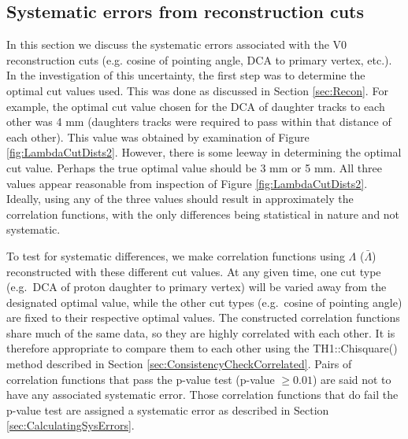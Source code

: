 \begin{figure}
\caption[]{}
\label{fig:ExampleFieldFailureSysErrors}
\end{figure}



\subsection{Systematic errors from reconstruction cuts}
\label{sec:SystematicsReconstruction}

In this section we discuss the systematic errors associated with the V0 reconstruction cuts (e.g. cosine of pointing angle, DCA to primary vertex, etc.).  In the investigation of this uncertainty, the first step was to determine the optimal cut values used.  This was done as discussed in Section \ref{sec:Recon}.  For example, the optimal cut value chosen for the DCA of daughter tracks to each other was 4 mm (daughters tracks were required to pass within that distance of each other).  This value was obtained by examination of Figure \ref{fig:LambdaCutDists2}.  However, there is some leeway in determining the optimal cut value.  Perhaps the true optimal value should be 3 mm or 5 mm.  All three values appear reasonable from inspection of Figure \ref{fig:LambdaCutDists2}.  Ideally, using any of the three values should result in approximately the correlation functions, with the only differences being statistical in nature and not systematic.  

To test for systematic differences, we make correlation functions using $\Lambda$ ($\bar{\Lambda}$) reconstructed with these different cut values.  At any given time, one cut type (e.g.\ DCA of proton daughter to primary vertex) will be varied away from the designated optimal value, while the other cut types (e.g.\ cosine of pointing angle) are fixed to their respective optimal values. The constructed correlation functions share much of the same data, so they are highly correlated with each other.  It is therefore appropriate to compare them to each other using the TH1::Chisquare() method described in Section \ref{sec:ConsistencyCheckCorrelated}.  Pairs of correlation functions that pass the p-value test (p-value $\geq 0.01$) are said not to have any associated systematic error.  Those correlation functions that do fail the p-value test are assigned a systematic error as described in Section \ref{sec:CalculatingSysErrors}.



